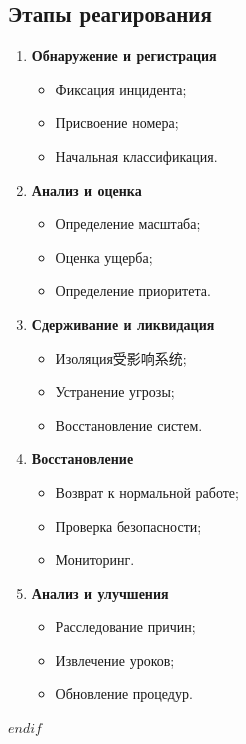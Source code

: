 \documentclass[14pt,a4paper]{extarticle}
\begin{document}
\subsection{Этапы реагирования}
\begin{enumerate}
    \item \textbf{Обнаружение и регистрация}
    \begin{itemize}
        \item Фиксация инцидента;
        \item Присвоение номера;
        \item Начальная классификация.
    \end{itemize}
    
    \item \textbf{Анализ и оценка}
    \begin{itemize}
        \item Определение масштаба;
        \item Оценка ущерба;
        \item Определение приоритета.
    \end{itemize}
    
    \item \textbf{Сдерживание и ликвидация}
    \begin{itemize}
        \item Изоляция受影响系统;
        \item Устранение угрозы;
        \item Восстановление систем.
    \end{itemize}
    
    \item \textbf{Восстановление}
    \begin{itemize}
        \item Возврат к нормальной работе;
        \item Проверка безопасности;
        \item Мониторинг.
    \end{itemize}
    
    \item \textbf{Анализ и улучшения}
    \begin{itemize}
        \item Расследование причин;
        \item Извлечение уроков;
        \item Обновление процедур.
    \end{itemize}
\end{enumerate}
$endif$
\end{document}
